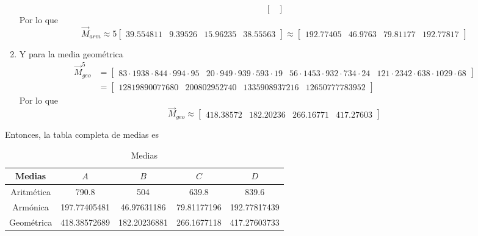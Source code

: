 \documentclass[]{article}
\begin{document}
\begin{enumerate}
{\[\begin{bmatrix}
            \end{bmatrix}
            \]
            Por lo que 
            \[\vec{M}_{arm} \approx
            5 
            \begin{bmatrix}
                39.554811 & 9.39526 & 15.96235 & 38.55563
            \end{bmatrix}
            \approx 
            \begin{bmatrix}
                192.77405 & 46.9763  & 79.81177 & 192.77817
            \end{bmatrix}
            \]
        }
        \item {
            Y para la media geométrica
            \begin{align*}
                \vec{M}_{geo} ^{5}
                &= 
                \begin{bmatrix}
                    83 \cdot 1938\cdot  844\cdot 994 \cdot 95 
                    & 20 \cdot 949 \cdot 939 \cdot 593 \cdot 19  
                    & 56 \cdot 1453 \cdot 932 \cdot 734 \cdot 24
                    & 121 \cdot 2342 \cdot 638 \cdot 1029 \cdot 68
                \end{bmatrix} \\
                &= 
                \begin{bmatrix}
                    12819890077680 & 200802952740 & 1335908937216 & 12650777783952
                \end{bmatrix}
            \end{align*}
            Por lo que 
            \[\vec{M}_{geo} \approx 
            \begin{bmatrix}
                418.38572 & 182.20236 & 266.16771 & 417.27603
            \end{bmatrix}
            \]
        }
    \end{enumerate}
    Entonces, la tabla completa de medias es 
    \begin{table}[H]
        \centering
        \caption{Medias}
        \begin{tabular}{|c|c|c|c|c|}
            \hline
             Medias & $A$ & $B$ & $C$ & $D$ \\
            \hline
            Aritmética & 790.8 & 504 & 639.8 & 839.6 \\
            Armónica & 197.77405481  & 46.97631186 & 79.81177196 & 192.77817439 \\
            Geométrica & 418.38572689 & 182.20236881 & 266.1677118 & 417.27603733 \\
            \hline
        \end{tabular}
    \end{table}
    
\end{document}
